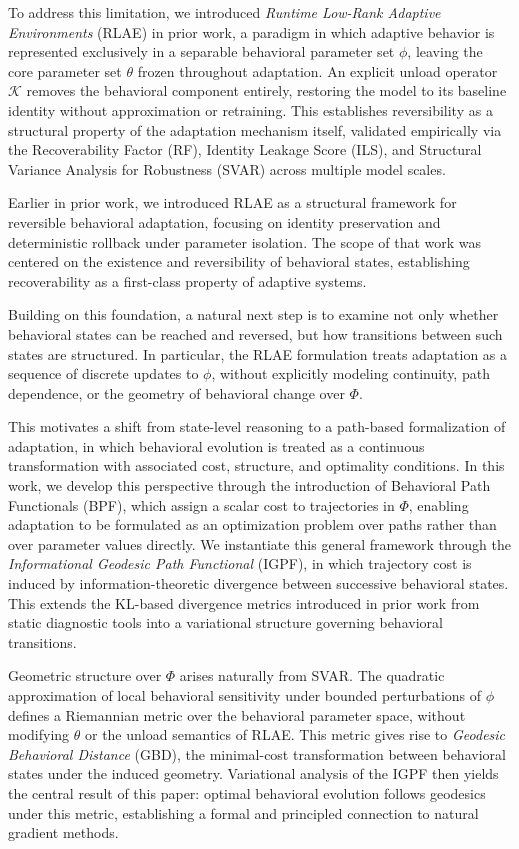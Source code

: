 \documentclass{article}
\begin{document}
To address this limitation, we introduced \textit{Runtime Low-Rank Adaptive Environments}
(RLAE) in prior work, a paradigm in which adaptive behavior is represented exclusively in a separable
behavioral parameter set $\phi$, leaving the core parameter set $\theta$ frozen throughout
adaptation. An explicit unload operator $\mathcal{K}$ removes the behavioral component
entirely, restoring the model to its baseline identity without approximation or retraining.
This establishes reversibility as a structural property of the adaptation mechanism itself,
validated empirically via the Recoverability Factor (RF), Identity Leakage Score (ILS), and
Structural Variance Analysis for Robustness (SVAR) across multiple model scales.

Earlier in prior work, we introduced RLAE as a structural framework for
reversible behavioral adaptation, focusing on identity preservation and deterministic rollback
under parameter isolation. The scope of that work was centered on the existence and
reversibility of behavioral states, establishing recoverability as a first-class property of
adaptive systems.

Building on this foundation, a natural next step is to examine not only whether behavioral
states can be reached and reversed, but how transitions between such states are structured.
In particular, the RLAE formulation treats adaptation as a sequence of discrete updates to
$\phi$, without explicitly modeling continuity, path dependence, or the geometry of
behavioral change over $\Phi$.

This motivates a shift from state-level reasoning to a path-based formalization of
adaptation, in which behavioral evolution is treated as a continuous transformation with
associated cost, structure, and optimality conditions. In this work, we develop this
perspective through the introduction of Behavioral Path Functionals (BPF), which assign 
a scalar cost to trajectories in $\Phi$, enabling adaptation to be formulated as an
optimization problem over paths rather than over parameter values directly. We instantiate
this general framework through the \textit{Informational Geodesic Path Functional} (IGPF),
in which trajectory cost is induced by information-theoretic divergence between successive
behavioral states. This extends the KL-based divergence metrics introduced in prior work
from static diagnostic tools into a variational structure governing behavioral transitions.

Geometric structure over $\Phi$ arises naturally from SVAR. The quadratic approximation of
local behavioral sensitivity under bounded perturbations of $\phi$ defines a Riemannian
metric over the behavioral parameter space, without modifying $\theta$ or the unload
semantics of RLAE. This metric gives rise to \textit{Geodesic Behavioral Distance} (GBD),
the minimal-cost transformation between behavioral states under the induced geometry.
Variational analysis of the IGPF then yields the central result of this paper: optimal
behavioral evolution follows geodesics under this metric, establishing a formal and
principled connection to natural gradient methods.
\end{document}
